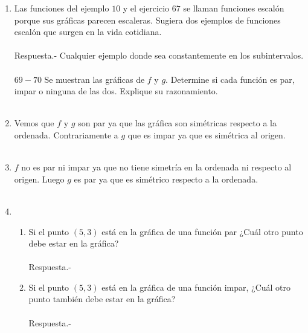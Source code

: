 \begin{enumerate}
\begin{enumerate}[\bfseries (a)]
    \end{enumerate}

    \item Las funciones del ejemplo $10$ y el ejercicio $67$ se llaman funciones escalón porque sus gráficas parecen escaleras. Sugiera dos ejemplos de funciones escalón que surgen en la vida cotidiana.\\\\
	Respuesta.-\; Cualquier ejemplo donde sea constantemente en los subintervalos.\\\\

$69-70$ Se muestran las gráficas de $f$ y $g$. Determine si cada función es par, impar o ninguna de las dos. Explique su razonamiento.\\\\

    \item Vemos que $f$ y $g$ son par ya que las gráfica son simétricas respecto a la ordenada. Contrariamente a $g$ que es impar ya que es simétrica al origen.\\\\

    \item $f$ no es par ni impar ya que no tiene simetría en la ordenada ni respecto al origen. Luego $g$ es par ya que es simétrico respecto a la ordenada.\\\\ 

    \item
    \begin{enumerate}
	
	\item Si el punto $(5,3)$ está en la gráfica de una función par ¿Cuál otro punto debe estar en la gráfica?\\\\
	    Respuesta.-\;

	\item Si el punto $(5,3)$ está en la gráfica de una función impar, ¿Cuál otro punto también debe estar en la gráfica?\\\\
	    Respuesta.-\;

    \end{enumerate}  

    \end{enumerate}
